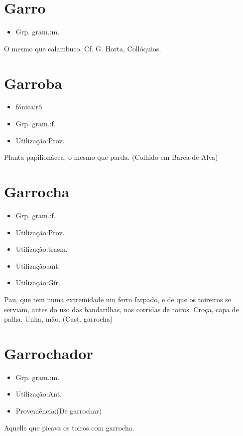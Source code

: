 \section{Garro}
\begin{itemize}
\item {Grp. gram.:m.}
\end{itemize}
O mesmo que \textunderscore calambuco\textunderscore . Cf. G. Horta, \textunderscore Collóquios\textunderscore .
\section{Garroba}
\begin{itemize}
\item {fónica:rô}
\end{itemize}
\begin{itemize}
\item {Grp. gram.:f.}
\end{itemize}
\begin{itemize}
\item {Utilização:Prov.}
\end{itemize}
Planta papilionácea, o mesmo que \textunderscore parda\textunderscore . (Colhido em Barca de Alva)
\section{Garrocha}
\begin{itemize}
\item {Grp. gram.:f.}
\end{itemize}
\begin{itemize}
\item {Utilização:Prov.}
\end{itemize}
\begin{itemize}
\item {Utilização:trasm.}
\end{itemize}
\begin{itemize}
\item {Utilização:ant.}
\end{itemize}
\begin{itemize}
\item {Utilização:Gír.}
\end{itemize}
Pau, que tem numa extremidade um ferro farpado, e de que os toireiros se serviam, antes do uso das bandarilhas, nas corridas de toiros.
Croça, capa de palha.
Unha, mão.
(Cast. \textunderscore garrocha\textunderscore )
\section{Garrochador}
\begin{itemize}
\item {Grp. gram.:m.}
\end{itemize}
\begin{itemize}
\item {Utilização:Ant.}
\end{itemize}
\begin{itemize}
\item {Proveniência:(De \textunderscore garrochar\textunderscore )}
\end{itemize}
Aquelle que picava os toiros com garrocha.
